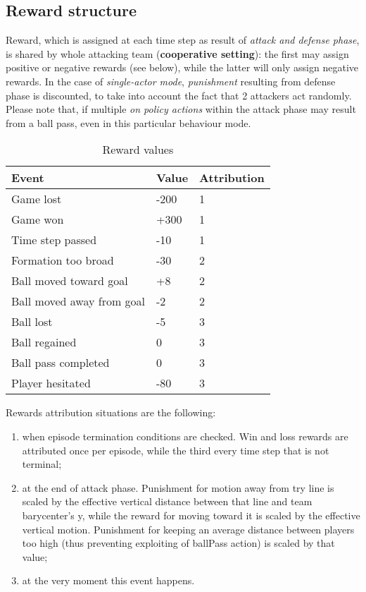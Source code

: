 \documentclass{article}
\begin{document}
\subsection{Reward structure}
Reward, which is assigned at each time step as result of \emph{attack and defense phase}, is shared by whole attacking team (\textbf{cooperative setting}): the first may assign positive or negative rewards (see below), while the latter will only assign negative rewards. In the case of \emph{single-actor mode},  \emph{punishment} resulting from defense phase is discounted, to take into account the fact that 2 attackers act randomly. Please note that, if multiple \emph{on policy actions} within the attack phase may result from a ball pass, even in this particular behaviour mode.

\begin{table}[H]
  \caption{Reward values}
  \label{reward_table}
  \centering
  \begin{tabular}{lll}
    Event     & Value      & Attribution\\
    \midrule
    Game lost & -200  & 1\\ 
    Game won & +300 & 1\\
    Time step passed     & -10       & 1\\
    Formation too broad & -30  & 2\\
    Ball moved toward goal & +8 & 2\\
    Ball moved away from goal & -2 & 2\\
    Ball lost & -5   & 3\\
    Ball regained & 0  & 3\\
    Ball pass completed & 0 & 3 \\
    Player hesitated & -80  & 3\\
    \bottomrule
  \end{tabular}
\end{table}

Rewards attribution situations are the following:
\begin{enumerate}
    \item when episode termination conditions are checked. Win and loss rewards are attributed once per episode, while the third every time step that is not terminal;
    \item at the end of attack phase. Punishment for motion away from try line is scaled by the effective vertical distance between that line and team barycenter's y, while the reward for moving toward it is scaled by the effective vertical motion. Punishment for keeping an average distance between players too high (thus preventing exploiting of ballPass action) is scaled by that value;
    \item at the very moment this event happens.
\end{enumerate}
\end{document}
